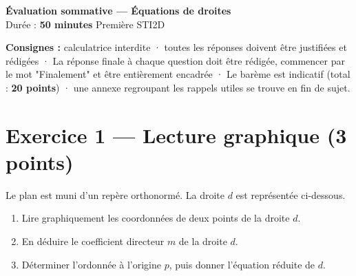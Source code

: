 \documentclass[11pt,a4paper]{article}
\begin{document}
\begin{center}
  {\large\bfseries Évaluation sommative — Équations de droites}\\[2pt]
  {\small Durée : \textbf{50 minutes} \quad\textbar\quad
   Première STI2D}
\end{center}

\vspace{-4pt}
\begin{tcolorbox}[colback=gray!5, colframe=gray!40, boxrule=0.4pt,
                  arc=2pt, left=6pt, right=6pt, top=3pt, bottom=3pt]
\small
\textbf{Consignes :} calculatrice interdite · toutes les réponses doivent être
justifiées et rédigées · La réponse finale à chaque question doit être rédigée, commencer par le mot "Finalement" et être entièrement encadrée · Le barème est indicatif (total : \textbf{20 points}) ·
une annexe regroupant les rappels utiles se trouve en fin de sujet.
\end{tcolorbox}
\vspace{4pt}

\section*{Exercice 1 — Lecture graphique \hfill \normalsize (3 points)}

\noindent\small Le plan est muni d'un repère orthonormé. La droite $d$ est représentée
ci-dessous.

\begin{center}
\end{center}

\vspace{-4pt}
\begin{enumerate}[label=\textbf{\arabic*.}, leftmargin=18pt]
  \item Lire graphiquement les coordonnées de deux points de la droite $d$.
  \item En déduire le coefficient directeur $m$ de la droite $d$.
  \item Déterminer l'ordonnée à l'origine $p$, puis donner l'équation réduite de $d$.
\end{enumerate}
\end{document}
